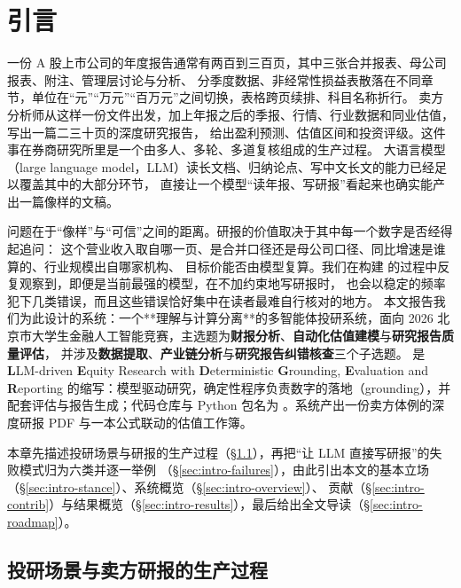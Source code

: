 \section{引言}
\label{sec:intro}

一份 A 股上市公司的年度报告通常有两百到三百页，其中三张合并报表、母公司报表、附注、管理层讨论与分析、
分季度数据、非经常性损益表散落在不同章节，单位在“元”“万元”“百万元”之间切换，表格跨页续排、科目名称折行。
卖方分析师从这样一份文件出发，加上年报之后的季报、行情、行业数据和同业估值，写出一篇二三十页的深度研究报告，
给出盈利预测、估值区间和投资评级。这件事在券商研究所里是一个由多人、多轮、多道复核组成的生产过程。
大语言模型（large language model，LLM）读长文档、归纳论点、写中文长文的能力已经足以覆盖其中的大部分环节，
直接让一个模型“读年报、写研报”看起来也确实能产出一篇像样的文稿。

问题在于“像样”与“可信”之间的距离。研报的价值取决于其中每一个数字是否经得起追问：
这个营业收入取自哪一页、是合并口径还是母公司口径、同比增速是谁算的、行业规模出自哪家机构、
目标价能否由模型复算。我们在构建 \sysname{} 的过程中反复观察到，即便是当前最强的模型，在不加约束地写研报时，
也会以稳定的频率犯下几类错误，而且这些错误恰好集中在读者最难自行核对的地方。
本文报告我们为此设计的系统：一个**理解与计算分离**的多智能体投研系统，面向 2026 北京市大学生金融人工智能竞赛，主选题为\textbf{财报分析}、\textbf{自动化估值建模}与\textbf{研究报告质量评估}，
并涉及\textbf{数据提取}、\textbf{产业链分析}与\textbf{研究报告纠错核查}三个子选题。\sysname{} 是 \textbf{L}LM-driven \textbf{E}quity Research with \textbf{D}eterministic \textbf{G}rounding, \textbf{E}valuation and \textbf{R}eporting 的缩写：模型驱动研究，确定性程序负责数字的落地（grounding），并配套评估与报告生成；代码仓库与 Python 包名为 。系统产出一份卖方体例的深度研报 PDF 与一本公式联动的估值工作簿。

本章先描述投研场景与研报的生产过程（\S\ref{sec:intro-scene}），再把“让 LLM 直接写研报”的失败模式归为六类并逐一举例
（\S\ref{sec:intro-failures}），由此引出本文的基本立场（\S\ref{sec:intro-stance}）、系统概览（\S\ref{sec:intro-overview}）、
贡献（\S\ref{sec:intro-contrib}）与结果概览（\S\ref{sec:intro-results}），最后给出全文导读（\S\ref{sec:intro-roadmap}）。

\subsection{投研场景与卖方研报的生产过程}
\label{sec:intro-scene}

